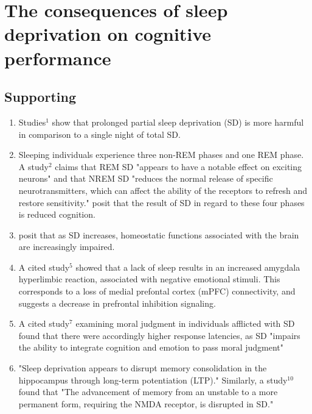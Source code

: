 \section{The consequences of sleep deprivation on cognitive performance \parencite{1}}

\begin{centering}\subsection{Supporting}\end{centering}

\begin{enumerate}

	\item Studies$^1$ show that prolonged partial sleep deprivation (SD) is more harmful in comparison to a single night of total SD.

	\item Sleeping individuals experience three non-REM phases and one REM phase. A study$^2$ claims that REM SD "appears to have a notable effect on exciting neurons" and that NREM SD "reduces the normal release of specific neurotransmitters, which can affect the ability of the receptors to refresh and restore sensitivity." \citeauthor{1} posit that the result of SD in regard to these four phases is reduced cognition.

	\item \citeauthor{1} posit that as SD increases, homeostatic functions associated with the brain are increasingly impaired.

	\item A cited study$^5$ showed that a lack of sleep results in an increased amygdala hyperlimbic reaction, associated with negative emotional stimuli. This corresponds to a loss of medial prefontal cortex (mPFC) connectivity, and suggests a decrease in prefrontal inhibition signaling.

	\item A cited study$^7$ examining moral judgment in individuals afflicted with SD found that there were accordingly higher response latencies, as SD "impairs the ability to integrate cognition and emotion to pass moral judgment"

	\item "Sleep deprivation appears to disrupt memory consolidation in the hippocampus through long-term potentiation (LTP)." Similarly, a study$^{10}$ found that "The advancement of memory from an unstable to a more permanent form, requiring the NMDA receptor, is disrupted in SD."


\end{enumerate}
